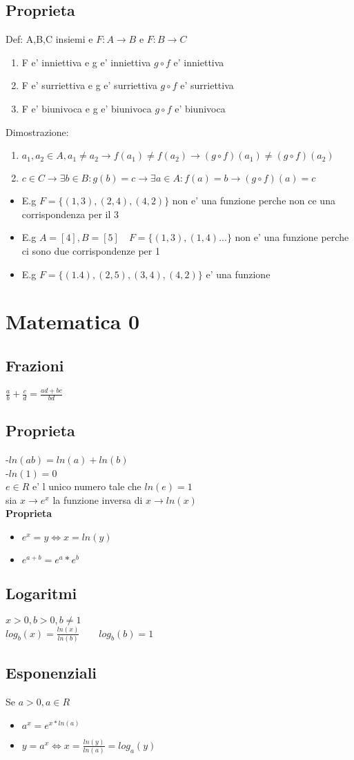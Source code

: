 \documentclass{article}
\begin{document}
   \subsection{Proprieta}
   Def: A,B,C insiemi e $F: A\to B$ e $F:B\to C$
   \begin{enumerate}
    \item F e' inniettiva e g e' inniettiva $g \circ f $ e' inniettiva
    \item F e' surriettiva e g e' surriettiva $g \circ f $ e' surriettiva
    \item F e' biunivoca e g e' biunivoca $g \circ f $ e' biunivoca
   \end{enumerate}
   Dimostrazione:
   \begin{enumerate}
    \item $a_1,a_2 \in A, a_1\neq a_2 \to f(a_1)\neq f(a_2)\to (g\circ f)(a_1)\neq (g\circ f)(a_2)$
    \item $c\in C \to \exists b\in B : g(b)=c \to \exists a\in A: f(a)=b\to (g\circ f)(a)=c$
   \end{enumerate}
   \begin{itemize}
    \item E.g $F=\{ (1,3),(2,4),(4,2)\}$ non e' una funzione perche non ce una corrispondenza per il 3
    \item E.g $A=[4],B=[5] \quad F=\{(1,3),(1,4)...\}$ non e' una funzione perche ci sono due corrispondenze per 1
    \item E.g $F=\{(1.4),(2,5),(3,4),(4,2)\}$ e' una funzione
   \end{itemize}
   \section*{Matematica 0}
   \subsection{Frazioni}
    $\frac{a}{b}+ \frac{c}{d}=\frac{ad+bc}{bd}$
    \subsection{Proprieta}
    -$ln(ab)=ln(a)+ln(b)$\\
    -$ln(1)=0$\\
    $e\in R$ e' l unico numero tale che $ln(e)=1$\\
    sia $x\to e^x$ la funzione inversa di $x\to ln(x)$\\
    \textbf{Proprieta}
    \begin{itemize}
        \item $e^x=y \iff x=ln(y)$
        \item $e^{a+b}=e^a*e^b$
    \end{itemize}
    \subsection{Logaritmi}
    $x>0,b>0,b\neq 1$\\
    $log_b(x)=\frac{ln(x)}{ln(b)} \quad \quad log_b(b)=1$
    \subsection{Esponenziali}
    Se $a>0,a\in R$
    \begin{itemize}
        \item $a^x=e^{x*ln(a)}$
        \item $y=a^x \iff x=\frac{ln(y)}{ln(a)}=log_a(y)$
    \end{itemize}
\end{document}
